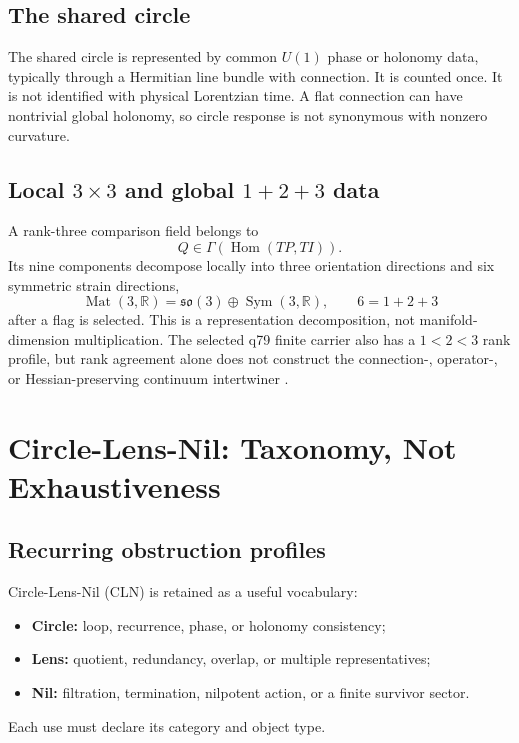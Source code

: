 \documentclass[11pt]{article}
\begin{document}
\subsection{The shared circle}

The shared circle is represented by common $U(1)$ phase or holonomy data,
typically through a Hermitian line bundle with connection.  It is counted once.
It is not identified with physical Lorentzian time.  A flat connection can
have nontrivial global holonomy, so circle response is not synonymous with
nonzero curvature.

\subsection{Local \texorpdfstring{$3\times3$}{3x3} and global
\texorpdfstring{$1+2+3$}{1+2+3} data}

A rank-three comparison field belongs to
\[
Q\in\Gamma(\operatorname{Hom}(TP,TI)).
\]
Its nine components decompose locally into three orientation directions and
six symmetric strain directions,
\[
\operatorname{Mat}(3,\mathbb R)
=\mathfrak{so}(3)\oplus\operatorname{Sym}(3,\mathbb R),
\qquad
6=1+2+3
\]
after a flag is selected.  This is a representation decomposition, not
manifold-dimension multiplication.  The selected q79 finite carrier also has
a $1<2<3$ rank profile, but rank agreement alone does not construct the
connection-, operator-, or Hessian-preserving continuum intertwiner
\cite{Nero2026_MTT_C_Realizations}.

\section{Circle-Lens-Nil: Taxonomy, Not Exhaustiveness}

\subsection{Recurring obstruction profiles}

Circle-Lens-Nil (CLN) is retained as a useful vocabulary:
\begin{itemize}
\item \textbf{Circle:} loop, recurrence, phase, or holonomy consistency;
\item \textbf{Lens:} quotient, redundancy, overlap, or multiple
representatives;
\item \textbf{Nil:} filtration, termination, nilpotent action, or a finite
survivor sector.
\end{itemize}
Each use must declare its category and object type.
\end{document}
